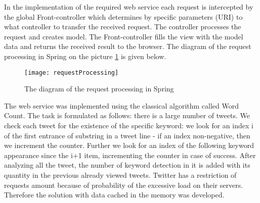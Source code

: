 In the implementation of the required web service each request is intercepted by the global Front-controller which determines by specific parameters (URI) to what controller to transfer the received request. The controller processes the request and creates model. The Front-controller fills the view with the model data and returns the received result to the browser. The diagram of the request processing in Spring on the picture \ref{fig:requestProcessing} is given below.



\begin{figure}[tbh]
\centering
\caption{The diagram of the request processing in Spring}
\label{fig:requestProcessing}
\texttt{[image: requestProcessing]}
\end{figure}


The web service was implemented using the classical algorithm called Word Count. The task is formulated as follows: there is a large number of tweets. We check each tweet for the existence of the specific keyword: we look for an index i of the first entrance of substring in a tweet line - if an index non-negative, then we increment the counter. Further we look for an index of the following keyword appearance since the i+1 item, incrementing the counter in case of success. After analyzing all the tweet, the number of keyword detection in it is added with its quantity in the previous already viewed tweets.  
Twitter has a restriction of requests amount because of probability of the excessive load on their servers. Therefore the solution with data cached in the memory was developed.
